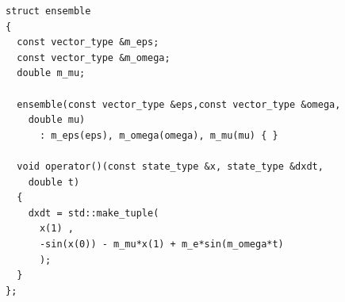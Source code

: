 \begin{frame}[fragile]


 \begin{lstlisting}[basicstyle=\scriptsize\ttfamily]
struct ensemble
{
  const vector_type &m_eps;
  const vector_type &m_omega;
  double m_mu;

  ensemble(const vector_type &eps,const vector_type &omega,
    double mu)
      : m_eps(eps), m_omega(omega), m_mu(mu) { }

  void operator()(const state_type &x, state_type &dxdt,
    double t)
  {
    dxdt = std::make_tuple(
      x(1) ,
      -sin(x(0)) - m_mu*x(1) + m_e*sin(m_omega*t)
      );
  }
};
 \end{lstlisting}


\end{frame}


